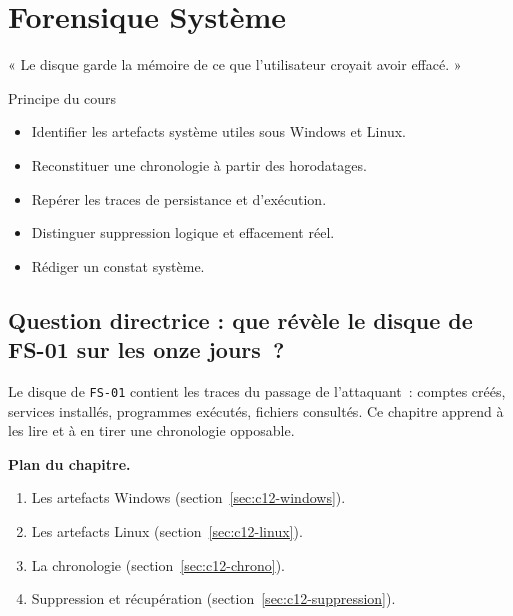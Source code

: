 
\chapter{Forensique Système}
\label{chap:systeme}

\epigraph{%
    « Le disque garde la mémoire de ce que l'utilisateur croyait avoir effacé. »%
}{Principe du cours}


\begin{boxobjectifs}
\begin{itemize}
    \item Identifier les artefacts système utiles sous Windows et Linux.
    \item Reconstituer une chronologie à partir des horodatages.
    \item Repérer les traces de persistance et d'exécution.
    \item Distinguer suppression logique et effacement réel.
    \item Rédiger un constat système.
\end{itemize}
\end{boxobjectifs}

\bigskip

\section*{Question directrice : que révèle le disque de FS-01 sur les onze jours~?}

Le disque de \texttt{FS-01} contient les traces du passage de l'attaquant~:
comptes créés, services installés, programmes exécutés, fichiers consultés.
Ce chapitre apprend à les lire et à en tirer une chronologie opposable.

\medskip
\textbf{Plan du chapitre.}
\begin{enumerate}
    \item Les artefacts Windows (section~\ref{sec:c12-windows}).
    \item Les artefacts Linux (section~\ref{sec:c12-linux}).
    \item La chronologie (section~\ref{sec:c12-chrono}).
    \item Suppression et récupération (section~\ref{sec:c12-suppression}).
\end{enumerate}

